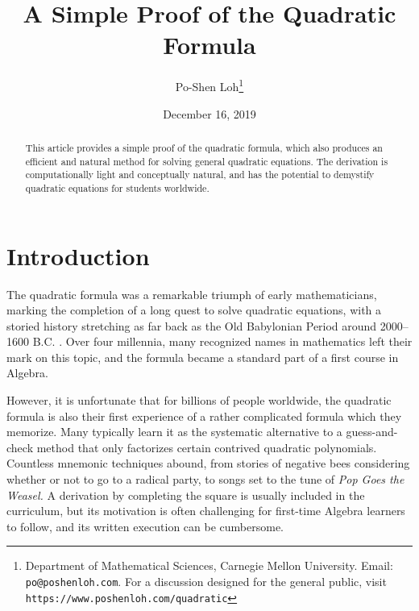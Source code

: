 
\title{A Simple Proof of the Quadratic Formula}

\author{Po-Shen Loh\thanks{Department of Mathematical Sciences, Carnegie Mellon
  University. Email: \texttt{po@poshenloh.com}. For a discussion designed for
  the general public, visit \texttt{https://www.poshenloh.com/quadratic}}}

\date{December 16, 2019}

\maketitle

\begin{abstract}
  This article provides a simple proof of the quadratic formula, which also
  produces an efficient and natural method for solving general quadratic
  equations. The derivation is computationally light and conceptually natural,
  and has the potential to demystify quadratic equations for students worldwide.
\end{abstract}

\section{Introduction}

The quadratic formula was a remarkable triumph of early mathematicians, marking
the completion of a long quest to solve quadratic equations, with a storied
history stretching as far back as the Old Babylonian Period around 2000--1600
B.C.  \cite{katz, robson}. 
Over four millennia, many recognized names in mathematics left their mark on
this topic, and the formula became a standard part of a first course in Algebra.

However, it is unfortunate that for billions of people worldwide, the quadratic
formula is also their first experience of a rather complicated formula which
they memorize. Many typically learn it as the systematic alternative to a
guess-and-check method that only factorizes certain contrived quadratic
polynomials. Countless mnemonic techniques abound, from stories of negative bees
considering whether or not to go to a radical party, to songs set to the tune of
\emph{Pop Goes the Weasel.} A derivation by completing the square is usually
included in the curriculum, but its motivation is often challenging for
first-time Algebra learners to follow, and its written execution can be
cumbersome.

